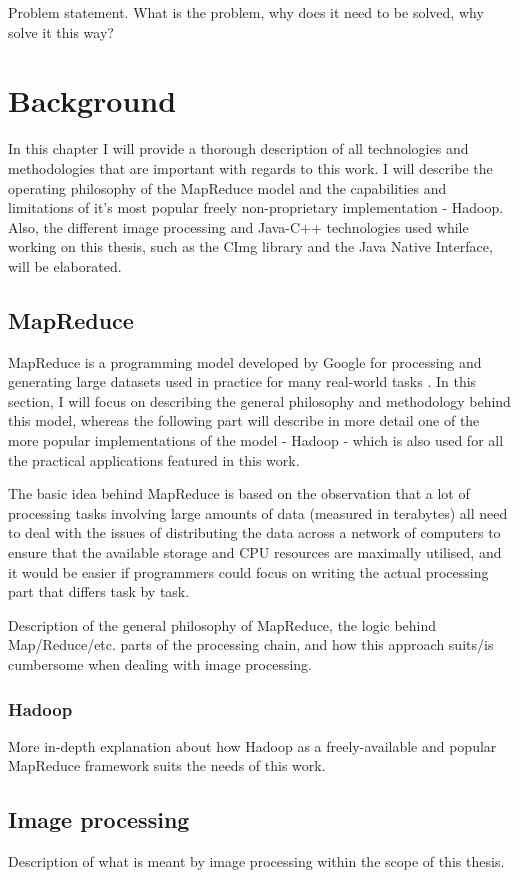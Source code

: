 \documentclass [12pt,a4paper]{report}
\begin{document}
Problem statement. What is the problem, why does it need to be solved, why solve it this way?

\chapter{Background}
In this chapter I will provide a thorough description of all technologies and methodologies that are important with regards to this work. I will describe the operating philosophy of the MapReduce model and the capabilities and limitations of it's most popular freely non-proprietary implementation - Hadoop. Also, the different image processing and Java-C++ technologies used while working on this thesis, such as the CImg library and the Java Native Interface, will be elaborated.

\section{MapReduce}

MapReduce is a programming model developed by Google for processing and generating large datasets used in practice for many real-world tasks \cite{Dean:2008:MSD:1327452.1327492}. In this section, I will focus on describing the general philosophy and methodology behind this model, whereas the following part will describe in more detail one of the more popular implementations of the model - Hadoop - which is also used for all the practical applications featured in this work.

The basic idea behind MapReduce is based on the observation that a lot of processing tasks involving large amounts of data (measured in terabytes) all need to deal with the issues of distributing the data across a network of computers to ensure that the available storage and CPU resources are maximally utilised, and it would be easier if programmers could focus on writing the actual processing part that differs task by task.

Description of the general philosophy of MapReduce, the logic behind Map/Reduce/etc. parts of the processing chain, and how this approach suits/is cumbersome when dealing with image processing.
\subsection{Hadoop}
More in-depth explanation about how Hadoop as a freely-available and popular MapReduce framework suits the needs of this work.

\section{Image processing}
Description of what is meant by image processing within the scope of this thesis.
\end{document}
